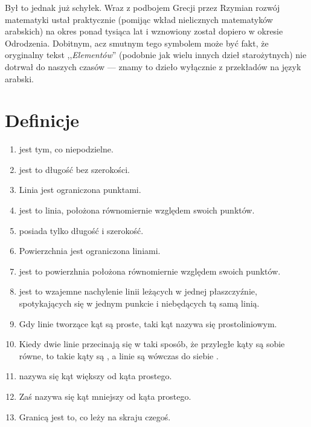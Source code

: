 \documentclass[12pt, a4paper]{scrartcl}
\begin{document}
Był to jednak już schyłek. Wraz z podbojem Grecji przez Rzymian rozwój
matematyki ustał praktycznie (pomijąc wkład nielicznych matematyków arabskich)
na okres ponad tysiąca lat i wznowiony został dopiero w okresie Odrodzenia.
Dobitnym, acz smutnym tego symbolem może być fakt, że oryginalny tekst
,,\emph{Elementów}'' (podobnie jak wielu innych dzieł starożytnych) nie dotrwał
do naszych czasów --- znamy to dzieło wyłącznie z przekładów na język arabski.

\pagebreak

\section*{Definicje}

\begin{enumerate}
    \itemsep0em
    \item \mkdef {} jest tym, co niepodzielne.
    \item \mkdef {} jest to długość bez szerokości.
    \item \mkdef Linia jest ograniczona punktami.
    \item \mkdef
         jest to linia, położona równomiernie względem swoich
        punktów.
    \item \mkdef {} posiada tylko długość i szerokość.
    \item \mkdef Powierzchnia jest ograniczona liniami.
    \item \mkdef
         jest to powierzhnia położona równomiernie względem
        swoich punktów.
    \item \mkdef
         jest to wzajemne nachylenie linii leżących w jednej
        płaszczyźnie, spotykających się w jednym punkcie i niebędących tą samą
        linią.
    \item \mkdef
        Gdy linie tworzące kąt są proste, taki kąt nazywa się prostoliniowym.
    \item \mkdef
        Kiedy dwie linie przecinają się w taki sposób, że przyległe kąty są
        sobie równe, to takie kąty są , a linie są wówczas
        do siebie .
    \item \mkdef {} nazywa się kąt większy od kąta prostego.
    \item \mkdef Zaś  nazywa się kąt mniejszy od kąta prostego.
    \item \mkdef Granicą jest to, co leży na skraju czegoś.

\end{enumerate}
\end{document}
